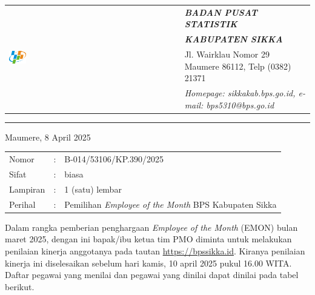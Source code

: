 \documentclass{article}
\begin{document}




\begin{tabular}{ll}
   \multirow{4}{*}{\includegraphics[width=0.10\textwidth]{logo/bps-logo.png}} %
   &
   \large{\textbf{\textit{BADAN PUSAT STATISTIK}}} \\
   & \large{\textbf{\textit{KABUPATEN SIKKA}}} \\
   & Jl. Wairklau Nomor 29 Maumere 86112, Telp (0382) 21371 \\
   & \textit{Homepage: sikkakab.bps.go.id, e-mail: bps5310@bps.go.id} \\
\end{tabular}

\hfill

\vspace{-1em} %

\rule{\linewidth}{1pt} %


\hfill
Maumere, 8 April 2025

\begin{tabular}{@{} lcl}
	Nomor&:&B-014/53106/KP.390/2025 \\
	Sifat&:&biasa \\
	Lampiran&:&1 (satu) lembar\\
    Perihal&:& Pemilihan \textit{Employee of the Month} BPS Kabupaten Sikka\\
\end{tabular}

\bigskip %

Dalam rangka pemberian penghargaan \textit{Employee of the Month} (EMON) bulan maret 2025, dengan ini bapak/ibu ketua tim PMO diminta untuk melakukan penilaian kinerja anggotanya pada tautan \href{https://bpssikka.id/}{https://bpssikka.id}.
Kiranya penilaian kinerja ini diselesaikan sebelum hari kamis, 10 april 2025 pukul 16.00 WITA.
Daftar pegawai yang menilai dan pegawai yang dinilai dapat dinilai pada tabel berikut.
\end{document}

